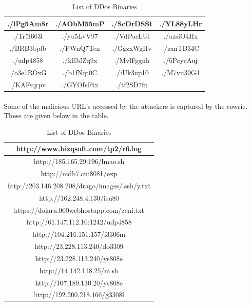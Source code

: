 \documentclass{report}
\begin{document}
\begin{table}[h!]
\begin{center}

\begin{tabular}{ |c|c|c|c| } 
 \hline
 ./lPg5Am8r & ./AObM55mP & ./ScDrDSSt & ./YL88yLHr\\
 \hline
 ./Tr5l603l & ./yu5LvV97 & ./VdPacLUl  & ./uzsiO4Hx \\
 \hline
 ./BRB3bpfb  & ./PWnQ7Tcn  & ./GgzxWgHv & ./zanTB34C  \\
 \hline
 ./udp4858 &  ./kEbIZq9x & ./MvlFggnh & ./6PcycAuj \\
 \hline
 ./o3e1ROxG  & ./b1fNqt0C & ./iUk3up10 & ./M7vu30G4 \\
 \hline
 ./KAFsqrpv & ./GYOIsFtx & ./tf2SD7fn &  \\
 \hline
\end{tabular}
\caption{List of DDos Binaries}
\end{center}
\end{table}

\paragraph{}
Some of the malicious URL's accessed by the attackers is captured by the cowrie. These are given below in the table.


\begin{table}[h!]
\begin{center}

\begin{tabular}{ |c| } 
 \hline
 http://www.bizqsoft.com/tp2/r6.log\\
 \hline
 http://185.165.29.196/lmao.sh\\
 \hline
 http://mdb7.cn:8081/exp  \\
 \hline
 http://203.146.208.208/drago/images/.ssh/y.txt \\
 \hline
 http://162.248.4.130/isu80 \\
 \hline
 https://doiaru.000webhostapp.com/zeni.txt  \\
 \hline
 http://61.147.112.10:1242/udp4858  \\
 \hline
 http://104.216.151.157/i3306m  \\
 \hline
  http://23.228.113.240/do3309  \\
 \hline
  http://23.228.113.240/ys808e  \\
 \hline
  http://14.142.118.25/m.sh  \\
 \hline
  http://107.189.130.20/ys808e  \\
 \hline
  http://192.200.218.166/g3308l  \\
 \hline
 
 
\end{tabular}
\caption{List of DDos Binaries}
\end{center}
\end{table}
\end{document}
